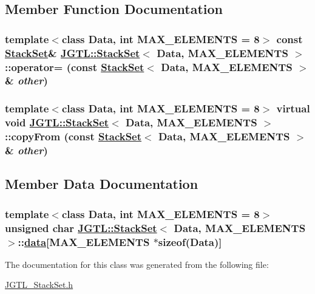 \subsection{Member Function Documentation}
\hypertarget{class_j_g_t_l_1_1_stack_set_6afeb5e3f6d4433b9938f3743f02aa1c}{
\subsubsection[operator=]{\setlength{\rightskip}{0pt plus 5cm}template$<$class Data, int MAX\_\-ELEMENTS = 8$>$ const \hyperlink{class_j_g_t_l_1_1_stack_set}{Stack\-Set}\& \hyperlink{class_j_g_t_l_1_1_stack_set}{JGTL::Stack\-Set}$<$ Data, MAX\_\-ELEMENTS $>$::operator= (const \hyperlink{class_j_g_t_l_1_1_stack_set}{Stack\-Set}$<$ Data, MAX\_\-ELEMENTS $>$ \& {\em other})}}
\label{class_j_g_t_l_1_1_stack_set_6afeb5e3f6d4433b9938f3743f02aa1c}


\hypertarget{class_j_g_t_l_1_1_stack_set_0f724177e6688d06eb8c4923e225e82f}{
\subsubsection[copyFrom]{\setlength{\rightskip}{0pt plus 5cm}template$<$class Data, int MAX\_\-ELEMENTS = 8$>$ virtual void \hyperlink{class_j_g_t_l_1_1_stack_set}{JGTL::Stack\-Set}$<$ Data, MAX\_\-ELEMENTS $>$::copy\-From (const \hyperlink{class_j_g_t_l_1_1_stack_set}{Stack\-Set}$<$ Data, MAX\_\-ELEMENTS $>$ \& {\em other})}}
\label{class_j_g_t_l_1_1_stack_set_0f724177e6688d06eb8c4923e225e82f}




\subsection{Member Data Documentation}
\hypertarget{class_j_g_t_l_1_1_stack_set_1c9f174be3aa9681935d4b7a300dbd79}{
\subsubsection[data]{\setlength{\rightskip}{0pt plus 5cm}template$<$class Data, int MAX\_\-ELEMENTS = 8$>$ unsigned char \hyperlink{class_j_g_t_l_1_1_stack_set}{JGTL::Stack\-Set}$<$ Data, MAX\_\-ELEMENTS $>$::\hyperlink{class_j_g_t_l_1_1_stack_set_1c9f174be3aa9681935d4b7a300dbd79}{data}\mbox{[}MAX\_\-ELEMENTS $\ast$sizeof(Data)\mbox{]}}}
\label{class_j_g_t_l_1_1_stack_set_1c9f174be3aa9681935d4b7a300dbd79}




The documentation for this class was generated from the following file:\begin{CompactItemize}
\item 
\hyperlink{_j_g_t_l___stack_set_8h}{JGTL\_\-Stack\-Set.h}\end{CompactItemize}
